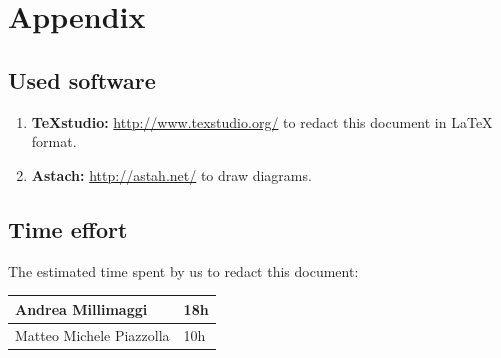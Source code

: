 \documentclass[english]{article}
\providecommand{\tabularnewline}{\\}
\begin{document}
	\newpage{}
	
	
	\pagebreak
	
	\pagebreak
	
	\pagebreak
	
	\pagebreak
	
	\pagebreak
	\section{Appendix}
	
	\subsection{Used software}
	\begin{enumerate}
		\item \textbf{TeXstudio:} \url{http://www.texstudio.org/} to redact this document in {\LaTeX} format.
		\item \textbf{Astach:} \url{http://astah.net/} to draw diagrams.		
	\end{enumerate}


\subsection{Time effort}
The estimated time spent by us to redact this document:
\begin{center}
	\begin{adjustbox}{max width=\textwidth}	
		\begin{tabular}{|l|>{\raggedright}p{15cm}|}
			
			\hline  Andrea Millimaggi & 18h \tabularnewline
			\hline 	Matteo Michele Piazzolla & 10h \tabularnewline
			\hline 		
		\end{tabular}
	\end{adjustbox}
\end{center}	
\end{document}
